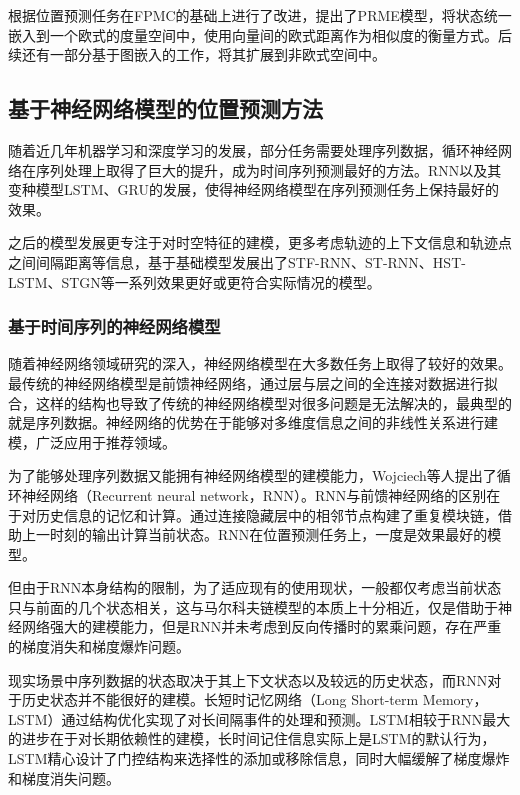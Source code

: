 \documentclass[master]{thesis-uestc}
\begin{document}
根据位置预测任务在FPMC的基础上进行了改进，提出了PRME模型，将状态统一嵌入到一个欧式的度量空间中，使用向量间的欧式距离作为相似度的衡量方式。后续还有一部分基于图嵌入的工作，将其扩展到非欧式空间中。

\subsection{基于神经网络模型的位置预测方法}
随着近几年机器学习和深度学习的发展，部分任务需要处理序列数据，循环神经网络在序列处理上取得了巨大的提升，成为时间序列预测最好的方法。RNN以及其变种模型LSTM、GRU的发展，使得神经网络模型在序列预测任务上保持最好的效果。

之后的模型发展更专注于对时空特征的建模，更多考虑轨迹的上下文信息和轨迹点之间间隔距离等信息，基于基础模型发展出了STF-RNN、ST-RNN、HST-LSTM、STGN等一系列效果更好或更符合实际情况的模型。

\subsubsection{基于时间序列的神经网络模型}
随着神经网络领域研究的深入，神经网络模型在大多数任务上取得了较好的效果。最传统的神经网络模型是前馈神经网络，通过层与层之间的全连接对数据进行拟合，这样的结构也导致了传统的神经网络模型对很多问题是无法解决的，最典型的就是序列数据。神经网络的优势在于能够对多维度信息之间的非线性关系进行建模，广泛应用于推荐领域。

为了能够处理序列数据又能拥有神经网络模型的建模能力，Wojciech等人提出了循环神经网络（Recurrent neural network，RNN）。RNN与前馈神经网络的区别在于对历史信息的记忆和计算。通过连接隐藏层中的相邻节点构建了重复模块链，借助上一时刻的输出计算当前状态。RNN在位置预测任务上，一度是效果最好的模型。

但由于RNN本身结构的限制，为了适应现有的使用现状，一般都仅考虑当前状态只与前面的几个状态相关，这与马尔科夫链模型的本质上十分相近，仅是借助于神经网络强大的建模能力，但是RNN并未考虑到反向传播时的累乘问题，存在严重的梯度消失和梯度爆炸问题。

现实场景中序列数据的状态取决于其上下文状态以及较远的历史状态，而RNN对于历史状态并不能很好的建模。长短时记忆网络（Long Short-term Memory，LSTM）通过结构优化实现了对长间隔事件的处理和预测。LSTM相较于RNN最大的进步在于对长期依赖性的建模，长时间记住信息实际上是LSTM的默认行为，LSTM精心设计了门控结构来选择性的添加或移除信息，同时大幅缓解了梯度爆炸和梯度消失问题。
\end{document}
